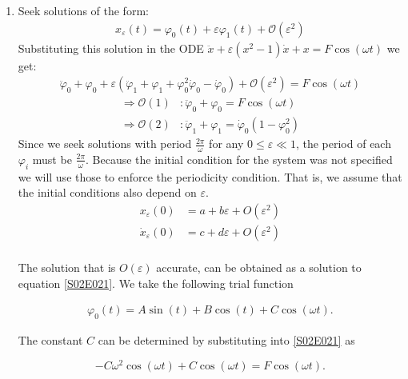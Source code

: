 \begin{solution}[2.4]
	\leavevmode
\begin{enumerate}
\item Seek solutions of the form:
\begin{align}
	x_\varepsilon(t)=\varphi_0(t)+ \varepsilon\varphi_1(t) + \mathcal{O}(\varepsilon^2)
\end{align}
Substituting this solution in the ODE $\ddot{x} + \varepsilon(x^2-1)\dot{x} + x = F\cos(\omega t)$ we get:
\begin{align}
	\ddot{\varphi}_0 + \varphi_0 + \varepsilon(\ddot{\varphi}_1 + \varphi_1 + \varphi_0^2\dot{\varphi}_0 - \dot{\varphi}_0) + \mathcal{O}(\varepsilon^2) = F\cos(\omega t)
\end{align}
\begin{align}
	\Longrightarrow \mathcal{O}(1) &: \ddot{\varphi}_0 + \varphi_0 = F\cos(\omega t) \label{S02E021} \\
	\Longrightarrow \mathcal{O}(2) &: \ddot{\varphi}_1 + \varphi_1 = \dot{\varphi}_0(1-\varphi_0^2) \label{S02E022}
\end{align}
Since we seek solutions with period $\frac{2\pi}{\omega}$ for any $0\leq \varepsilon \ll 1$, the period of each $\varphi_i$ must be $\frac{2\pi}{\omega}$.
Because the initial condition for the system was not specified we will use those to enforce the periodicity condition. That is, we assume that the initial conditions also depend on $\varepsilon$.
\begin{align}
x_\varepsilon(0) &= a + b\varepsilon + O(\varepsilon^2) \\
\dot{x}_\varepsilon(0) &= c + d\varepsilon + O(\varepsilon^2) \\
\end{align}

The solution that is $O(\varepsilon)$ accurate, can be obtained as a solution to equation \eqref{S02E021}. We take the following trial function 

\begin{align}
	\varphi_0(t) = A\sin(t) + B\cos(t) + C \cos(\omega t). \label{S02E023}
\end{align}

The constant $C$ can be determined by substituting into \eqref{S02E021} as

$$
-C\omega^2 \cos(\omega t) + C\cos(\omega t) = F \cos(\omega t).
$$


\end{enumerate}
\end{solution}

